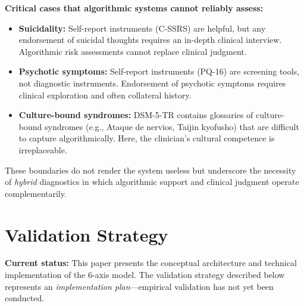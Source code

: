 \documentclass[11pt,a4paper]{article}
\begin{document}
\textbf{Critical cases that algorithmic systems cannot reliably assess:}
\begin{itemize}[noitemsep]
\item \textbf{Suicidality:} Self-report instruments (C-SSRS) are helpful, but any endorsement of suicidal thoughts requires an in-depth clinical interview. Algorithmic risk assessments cannot replace clinical judgment.
\item \textbf{Psychotic symptoms:} Self-report instruments (PQ-16) are screening tools, not diagnostic instruments. Endorsement of psychotic symptoms requires clinical exploration and often collateral history.
\item \textbf{Culture-bound syndromes:} DSM-5-TR contains glossaries of culture-bound syndromes (e.g., Ataque de nervios, Taijin kyofusho) that are difficult to capture algorithmically. Here, the clinician's cultural competence is irreplaceable.
\end{itemize}

These boundaries do not render the system useless but underscore the necessity of \textit{hybrid} diagnostics in which algorithmic support and clinical judgment operate complementarily.

\section{Validation Strategy}
\label{sec:validation}

\textbf{Current status:} This paper presents the conceptual architecture and technical implementation of the 6-axis model. The validation strategy described below represents an \textit{implementation plan}---empirical validation has not yet been conducted.
\end{document}
